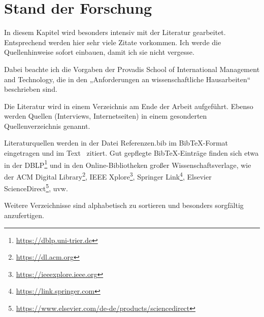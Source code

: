 %

\chapter{Stand der Forschung}

In diesem Kapitel wird besonders intensiv mit der Literatur gearbeitet. Entsprechend werden hier sehr viele Zitate vorkommen. Ich werde die Quellenhinweise sofort einbauen, damit ich sie nicht vergesse. 

Dabei beachte ich die Vorgaben der Provadis School of International Management and Technology, die in den „Anforderungen an wissenschaftliche Hausarbeiten“ beschrieben sind.

Die Literatur wird in einem Verzeichnis am Ende der Arbeit aufgeführt.
Ebenso werden Quellen (Interviews, Internetseiten) in einem gesonderten Quellenverzeichnis genannt.

Literaturquellen werden in der Datei Referenzen.bib im BibTeX-Format eingetragen und im Text~\cite{lustigeCitation} zitiert. Gut gepflegte BibTeX-Einträge finden sich etwa in der DBLP\footnote{\url{https://dblp.uni-trier.de}} und in den Online-Bibliotheken großer Wissenschaftsverlage, wie der ACM Digital Library\footnote{\url{https://dl.acm.org}}, IEEE Xplore\footnote{\url{https://ieeexplore.ieee.org}}, Springer Link\footnote{\url{https://link.springer.com}}, Elsevier ScienceDirect\footnote{\url{https://www.elsevier.com/de-de/products/sciencedirect}}, uvw.

Weitere Verzeichnisse sind alphabetisch zu sortieren und besonders sorgfältig anzufertigen.